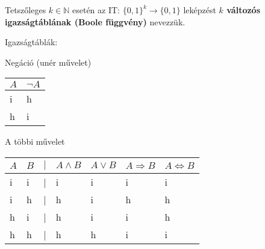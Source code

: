\begin{frame}
\begin{tcolorbox}[title={K változós igazságtábla}]
Tetszőleges $k \in \mathbb{N}$ esetén az IT: $\{0, 1\}^k \rightarrow \{0, 1\}$ leképzést \textbf{$k$ változós igazságtáblának (Boole függvény)} nevezzük.
\end{tcolorbox}

\begin{block}{Igazságtáblák:}
\begin{table}[h!]
\centering
Negáció (unér művelet)\\
\mbigskip
\begin{tabular}{@{}C{3em}C{3em}@{}}
\toprule
\textbf{$A$} & \textbf{${\neg}A$} \\
\hline
i & h\\
\hdashline
h & i\\
\toprule
\end{tabular}
\end{table}
\mbigskip

\begin{table}[h!]
\centering
A többi művelet\\
\mbigskip
\begin{tabular}{C{1em}C{1em}rC{4.4em}C{4.4em}C{4.4em}C{4.6em}}
\toprule
\textbf{$A$} & \textbf{$B$} & \textbf{$|$} & \textbf{$A \land B$} & \textbf{$A \lor B$} & \textbf{$A \Rightarrow B$} & \textbf{$A \iff B$} \\
\hline
i & i & | & i & i & i & i\\
\hdashline
i & h & | & h & i & h & h\\
\hdashline
h & i & | & h & i & i & h\\
\hdashline
h & h & | & h & h & i & i\\
\toprule
\end{tabular}
\end{table}
\end{block}

\end{frame}


